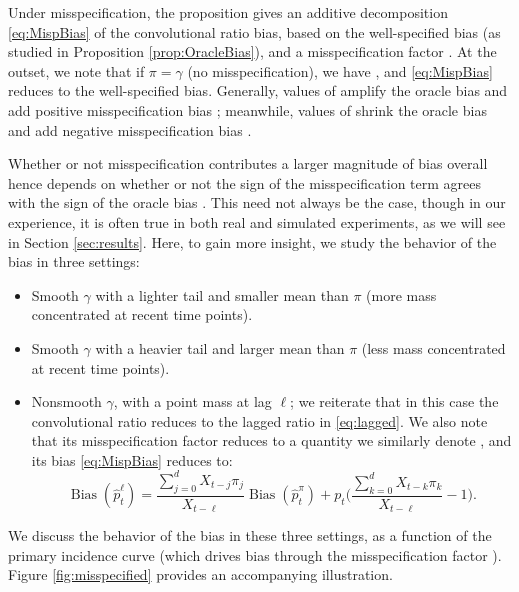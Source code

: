 \documentclass{article}
\renewcommand{\hat}{\widehat} %
\DeclareMathOperator{\bias}{Bias}
\begin{document}
Under misspecification, the proposition gives an
additive decomposition \eqref{eq:MispBias} of the convolutional ratio bias,
based on the well-specified bias \smash{$\bias(\hat{p}_t^\pi)$} (as studied in
Proposition \ref{prop:OracleBias}), and a misspecification factor
. At the outset, we note that if $\pi = \gamma$ (no  
misspecification), we have , and \eqref{eq:MispBias}
reduces to the well-specified bias. Generally, values of  amplify the oracle bias and add positive misspecification bias ; meanwhile, values of  shrink the
oracle bias and add negative misspecification bias . 

Whether or not misspecification contributes a larger magnitude of bias overall
hence depends on whether or not the sign of the misspecification term  agrees with the sign of the oracle bias
\smash{$\bias(\hat{p}_t^\pi)$}. This need not always be the case, though in our
experience, it is often true in both real and simulated experiments, as we will
see in Section \ref{sec:results}. Here, to gain more insight, we study the
behavior of the bias in three settings: 
\begin{itemize} 
\item Smooth $\gamma$ with a lighter tail and smaller mean than $\pi$ (more mass
  concentrated at recent time points).    
\item Smooth $\gamma$ with a heavier tail and larger mean than $\pi$ (less mass
  concentrated at recent time points).    
\item Nonsmooth $\gamma$, with a point mass at lag $\ell$; we reiterate that in 
  this case the convolutional ratio reduces to the lagged ratio
  \smash{$\hat{p}_t^\ell$} in \eqref{eq:lagged}. We also note that its
  misspecification factor  reduces to a quantity we
  similarly denote , and its bias \eqref{eq:MispBias} reduces to: 
  \begin{equation}
  \label{eq:LagBias}
  \bias(\hat{p}_t^\ell) = \frac{\sum_{j=0}^d X_{t-j}\pi_j}{X_{t-\ell}}
  \bias(\hat{p}_t^\pi) + p_t \Bigg(\frac{\sum_{k=0}^d X_{t-k}\pi_k}{X_{t-\ell}}
  - 1 \Bigg).  
\end{equation}
\end{itemize}

We discuss the behavior of the bias in these three settings, as a function of
the primary incidence curve (which drives bias through the misspecification
factor ). Figure \ref{fig:misspecified} provides an
accompanying illustration.
\end{document}
